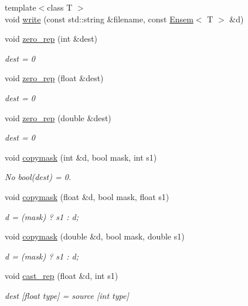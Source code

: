 \begin{DoxyCompactItemize}
\item 
{\footnotesize template$<$class T $>$ }\\void \mbox{\hyperlink{namespaceENSEM_a2159da8c0a7ad6eec6b0d7179f0251e8}{write}} (const std\+::string \&filename, const \mbox{\hyperlink{classENSEM_1_1Ensem}{Ensem}}$<$ T $>$ \&d)
\item 
void \mbox{\hyperlink{group__simpleword_ga7c61b338c433315893ce5f76f722f66a}{zero\+\_\+rep}} (int \&dest)
\begin{DoxyCompactList}\small\item\em dest = 0 \end{DoxyCompactList}\item 
void \mbox{\hyperlink{group__simpleword_ga1f2afd419d94a7dc847ef1caee72fea4}{zero\+\_\+rep}} (float \&dest)
\begin{DoxyCompactList}\small\item\em dest = 0 \end{DoxyCompactList}\item 
void \mbox{\hyperlink{group__simpleword_gab3b525c306493092ee2a6b0369d8102c}{zero\+\_\+rep}} (double \&dest)
\begin{DoxyCompactList}\small\item\em dest = 0 \end{DoxyCompactList}\item 
void \mbox{\hyperlink{group__simpleword_gab61b33e199acc41a1defab4556948f0d}{copymask}} (int \&d, bool mask, int s1)
\begin{DoxyCompactList}\small\item\em No bool(dest) = 0. \end{DoxyCompactList}\item 
void \mbox{\hyperlink{group__simpleword_ga048f9b334cb6423a697842f7f13b5db2}{copymask}} (float \&d, bool mask, float s1)
\begin{DoxyCompactList}\small\item\em d = (mask) ? s1 \+: d; \end{DoxyCompactList}\item 
void \mbox{\hyperlink{group__simpleword_gaa25c2164622e826d4beb49ebe0c1f996}{copymask}} (double \&d, bool mask, double s1)
\begin{DoxyCompactList}\small\item\em d = (mask) ? s1 \+: d; \end{DoxyCompactList}\item 
void \mbox{\hyperlink{group__simpleword_gabc2c653f0d7a689e3a07dd2cd911dee3}{cast\+\_\+rep}} (float \&d, int s1)
\begin{DoxyCompactList}\small\item\em dest \mbox{[}float type\mbox{]} = source \mbox{[}int type\mbox{]} \end{DoxyCompactList}\item 

\end{DoxyCompactItemize}
